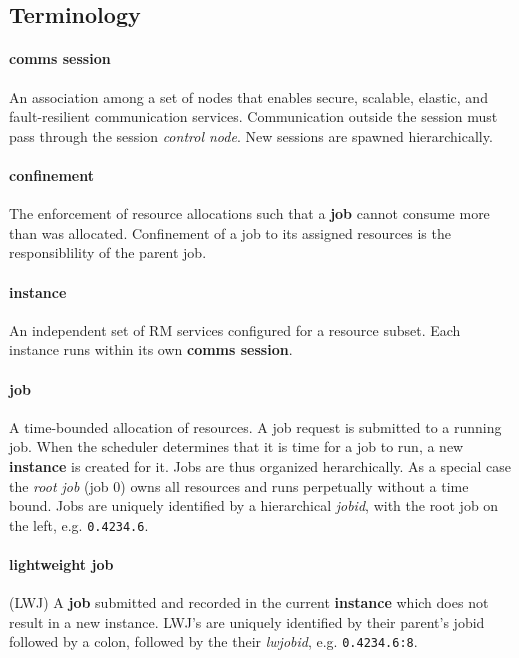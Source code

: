 \documentclass{article}
\begin{document}
\subsection{Terminology}

\paragraph{comms session}
An association among a set of nodes that enables secure, scalable,
elastic, and fault-resilient communication services.
Communication outside the session must pass through the session
{\em control node}.  New sessions are spawned hierarchically.

\paragraph{confinement}
The enforcement of resource allocations such that a {\bf job} cannot
consume more than was allocated.  Confinement of a job to its assigned
resources is the responsiblility of the parent job.

\paragraph{instance}
An independent set of RM services configured for a resource subset.
Each instance runs within its own {\bf comms session}.

\paragraph{job}
A time-bounded allocation of resources.
A job request is submitted to a running job.
When the scheduler determines that it is time for a job to run,
a new {\bf instance} is created for it.  Jobs are thus organized
herarchically.
As a special case the {\em root job} (job 0) owns all resources and
runs perpetually without a time bound.
Jobs are uniquely identified by a hierarchical {\em jobid},
with the root job on the left, e.g. {\tt 0.4234.6}.

\paragraph{lightweight job} (LWJ) 
A {\bf job} submitted and recorded in the current {\bf instance}
which does not result in a new instance.
LWJ's are uniquely identified by their parent's jobid followed
by a colon, followed by the their {\em lwjobid}, e.g. {\tt 0.4234.6:8}.
\end{document}
